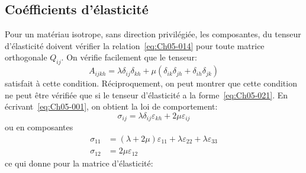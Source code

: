 \subsection{Coéfficients d'élasticité} \label{ssec:Ch05-2.1}
Pour un matériau isotrope, sans direction privilégiée, les composantes, du tenseur d'élasticité doivent vérifier la relation~\eqref{eq:Ch05-014} pour toute matrice orthogonale $Q_{ij}$.
On vérifie facilement que le tenseur: 
\begin{equation}
    A_{ijkh} = \lambda \delta_{ij} \delta_{kh} + \mu \left( \delta_{ik} \delta_{jh} + \delta_{ih} \delta_{jk} \right)
    \label{eq:Ch05-021}
\end{equation}
satisfait à cette condition.
Réciproquement, on peut montrer que cette condition ne peut être vérifiée que si le tenseur d'élasticité a la forme~\eqref{eq:Ch05-021}.
En écrivant~\eqref{eq:Ch05-001}, on obtient la loi de comportement: 
\begin{equation}
    \sigma_{ij} = \lambda \delta_{ij} \varepsilon_{kh} + 2 \mu \varepsilon_{ij}
    \label{eq:Ch05-022}
\end{equation}
ou en composantes 
\begin{equation}
    \begin{aligned}
        \sigma_{11} &= \left( \lambda+ 2 \mu \right) \varepsilon_{11} + \lambda \varepsilon_{22} + \lambda \varepsilon_{33} \\
        \sigma_{12} &= 2\mu \varepsilon_{12}
    \end{aligned}
    \label{eq:Ch05-023}
\end{equation}
ce qui donne pour la matrice d'élasticité: 
